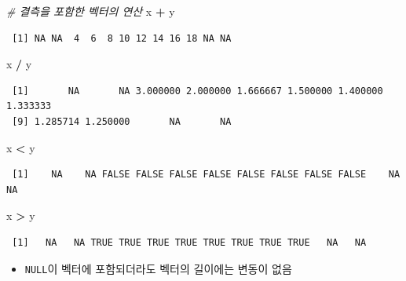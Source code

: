\documentclass[
  11pt,
]{krantz}
\newenvironment{Shaded}{\begin{snugshade}}{\end{snugshade}}
\newcommand{\CommentTok}[1]{\textcolor[rgb]{0.37,0.37,0.37}{\textit{#1}}}
\newcommand{\NormalTok}[1]{#1}
\newcommand{\OperatorTok}[1]{\textcolor[rgb]{0.43,0.43,0.43}{\textbf{#1}}}
\newcommand{\StringTok}[1]{\textcolor[rgb]{0.5,0.5,0.5}{#1}}
\providecommand{\tightlist}{%
  \setlength{\itemsep}{0pt}\setlength{\parskip}{0pt}}
\begin{document}
\begin{Shaded}
\begin{Highlighting}[]
\CommentTok{# 결측을 포함한 벡터의 연산 }
\NormalTok{x }\OperatorTok{+}\StringTok{ }\NormalTok{y}
\end{Highlighting}
\end{Shaded}

\begin{verbatim}
 [1] NA NA  4  6  8 10 12 14 16 18 NA NA
\end{verbatim}

\begin{Shaded}
\begin{Highlighting}[]
\NormalTok{x }\OperatorTok{/}\StringTok{ }\NormalTok{y}
\end{Highlighting}
\end{Shaded}

\begin{verbatim}
 [1]       NA       NA 3.000000 2.000000 1.666667 1.500000 1.400000 1.333333
 [9] 1.285714 1.250000       NA       NA
\end{verbatim}

\begin{Shaded}
\begin{Highlighting}[]
\NormalTok{x }\OperatorTok{<}\StringTok{ }\NormalTok{y}
\end{Highlighting}
\end{Shaded}

\begin{verbatim}
 [1]    NA    NA FALSE FALSE FALSE FALSE FALSE FALSE FALSE FALSE    NA    NA
\end{verbatim}

\begin{Shaded}
\begin{Highlighting}[]
\NormalTok{x }\OperatorTok{>}\StringTok{ }\NormalTok{y}
\end{Highlighting}
\end{Shaded}

\begin{verbatim}
 [1]   NA   NA TRUE TRUE TRUE TRUE TRUE TRUE TRUE TRUE   NA   NA
\end{verbatim}

\normalsize

\begin{itemize}
\tightlist
\item
  \texttt{NULL}이 벡터에 포함되더라도 벡터의 길이에는 변동이 없음
\end{itemize}

\footnotesize
\end{document}
